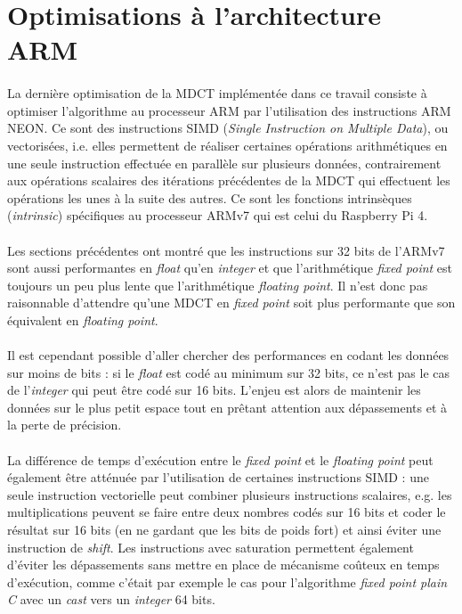\documentclass{article}
\begin{document}
    \newpage
    \section{Optimisations à l'architecture ARM}
    \label{sec:simd}
    \paragraph{}
    La dernière optimisation de la MDCT implémentée dans ce travail consiste à optimiser l'algorithme au processeur ARM par l'utilisation des instructions ARM NEON. Ce sont des instructions SIMD (\emph{Single Instruction on Multiple Data}), ou vectorisées, i.e. elles permettent de réaliser certaines opérations arithmétiques en une seule instruction effectuée en parallèle sur plusieurs données, contrairement aux opérations scalaires des itérations précédentes de la MDCT qui effectuent les opérations les unes à la suite des autres. Ce sont les fonctions intrinsèques (\emph{intrinsic}) spécifiques au processeur ARMv7 qui est celui du Raspberry Pi 4.

    \paragraph{}
    Les sections précédentes ont montré que les instructions sur 32 bits de l'ARMv7 sont aussi performantes en \emph{float} qu'en \emph{integer} et que l'arithmétique \emph{fixed point} est toujours un peu plus lente que l'arithmétique \emph{floating point}. Il n'est donc pas raisonnable d'attendre qu'une MDCT en \emph{fixed point} soit plus performante que son équivalent en \emph{floating point}.

    \paragraph{}
    Il est cependant possible d'aller chercher des performances en codant les données sur moins de bits : si le \emph{float} est codé au minimum sur 32 bits, ce n'est pas le cas de l'\emph{integer} qui peut être codé sur 16 bits. L'enjeu est alors de maintenir les données sur le plus petit espace tout en prêtant attention aux dépassements et à la perte de précision.

    \paragraph{}
    La différence de temps d'exécution entre le \emph{fixed point} et le \emph{floating point} peut également être atténuée par l'utilisation de certaines instructions SIMD : une seule instruction vectorielle peut combiner plusieurs instructions scalaires, e.g. les multiplications peuvent se faire entre deux nombres codés sur 16 bits et coder le résultat sur 16 bits (en ne gardant que les bits de poids fort) et ainsi éviter une instruction de \emph{shift}. Les instructions avec saturation permettent également d'éviter les dépassements sans mettre en place de mécanisme coûteux en temps d'exécution, comme c'était par exemple le cas pour l'algorithme \emph{fixed point plain C} avec un \emph{cast} vers un \emph{integer} 64 bits.
\end{document}
